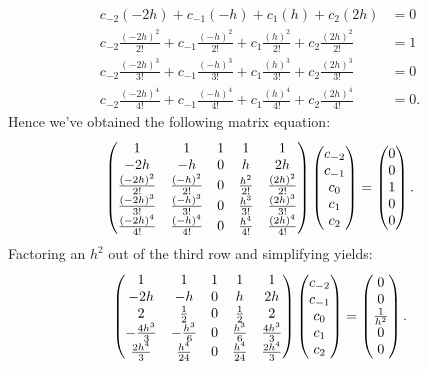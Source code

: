 \documentclass[12pt,twoside,openany]{memoir}
\begin{document}
\begin{solution}
\begin{enumerate}[label = (\arabic*),itemsep=1pt,topsep=3pt]
\begin{equation*}
\begin{split}
        c_{-2}(-2h) + c_{-1}(-h) + c_{1}(h) + c_{2}(2h) &= 0 \\
        c_{-2}\frac{(-2h)^2}{2!} + c_{-1}\frac{(-h)^2}{2!}  + c_{1}\frac{(h)^2}{2!} + c_{2}\frac{(2h)^2}{2!} & = 1 \\
        c_{-2}\frac{(-2h)^3}{3!} + c_{-1}\frac{(-h)^3}{3!}  + c_{1}\frac{(h)^3}{3!} + c_{2}\frac{(2h)^3}{3!} & = 0 \\
        c_{-2}\frac{(-2h)^4}{4!} + c_{-1}\frac{(-h)^4}{4!}  + c_{1}\frac{(h)^4}{4!} + c_{2}\frac{(2h)^4}{4!} & = 0.
    \end{split}
    \end{equation*}
Hence we've obtained the following matrix equation:
    \begin{equation*}
    \begin{split}
        \left( \begin{matrix}
        1 & 1 & 1 & 1 & 1 \\
        -2h & -h & 0 & h & 2h \\
        \frac{(-2h)^2}{2!} & \frac{(-h)^2}{2!} & 0 & \frac{h^2}{2!} & \frac{(2h)^2}{2!}\\
        \frac{(-2h)^3}{3!} & \frac{(-h)^3}{3!} & 0 & \frac{h^3}{3!} & \frac{(2h)^3}{3!}\\
        \frac{(-2h)^4}{4!} & \frac{(-h)^4}{4!} & 0 & \frac{h^4}{4!} & \frac{(2h)^4}{4!}\\
        \end{matrix} \right)
        \left( \begin{matrix} c_{-2} \\ c_{-1} \\ c_{0} \\ c_{1} \\ c_{2} \end{matrix} \right)  
        = \left( \begin{matrix} 0 \\ 0 \\ 1 \\ 0\\ 0 \end{matrix} \right) .
    \end{split}
    \end{equation*}
Factoring an $h^2$ out of the third row and simplifying yields:
    \begin{equation*}
    \begin{split}
        \left( \begin{matrix}
        1 & 1 & 1 & 1 & 1 \\
        -2h & -h & 0 & h & 2h \\
        2 & \frac{1}{2} & 0 & \frac{1}{2} & 2\\
        -\frac{4h^3}{3} & -\frac{h^3}{6} & 0 & \frac{h^3}{6} & \frac{4h^3}{3}\\
        \frac{2h^4}{3} & \frac{h^4}{24} & 0 & \frac{h^4}{24} & \frac{2h^4}{3}\\
        \end{matrix} \right)
        \left( \begin{matrix} c_{-2} \\ c_{-1} \\ c_{0} \\ c_{1} \\ c_{2} \end{matrix} \right)  
        = \left( \begin{matrix} 0 \\ 0 \\ \frac{1}{h^2} \\ 0\\ 0 \end{matrix} \right) .
    \end{split}
    \end{equation*}


\end{enumerate}
\end{solution}
\end{document}
